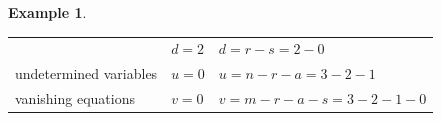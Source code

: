 \documentclass[]{book}
\theoremstyle{definition}
\theoremstyle{definition}
\newtheorem{example}{Example}[chapter]
\theoremstyle{definition}
\theoremstyle{remark}
\begin{document}
\begin{example}
\begin{longtable}[]{@{}lll@{}}
\begin{minipage}[t]{0.20\columnwidth}
\end{minipage} & \begin{minipage}[t]{0.24\columnwidth}\raggedright
\(d=2\)\strut
\end{minipage} & \begin{minipage}[t]{0.47\columnwidth}\raggedright
\(d=r-s=2-0\)\strut
\end{minipage}\tabularnewline
\begin{minipage}[t]{0.20\columnwidth}\raggedright
undetermined variables\strut
\end{minipage} & \begin{minipage}[t]{0.24\columnwidth}\raggedright
\(u=0\)\strut
\end{minipage} & \begin{minipage}[t]{0.47\columnwidth}\raggedright
\(u=n-r-a=3-2-1\)\strut
\end{minipage}\tabularnewline
\begin{minipage}[t]{0.20\columnwidth}\raggedright
vanishing equations\strut
\end{minipage} & \begin{minipage}[t]{0.24\columnwidth}\raggedright
\(v=0\)\strut
\end{minipage} & \begin{minipage}[t]{0.47\columnwidth}\raggedright
\(v=m-r-a-s=3-2-1-0\)\strut
\end{minipage}\tabularnewline
\bottomrule
\end{longtable}
\end{example}
\end{document}
